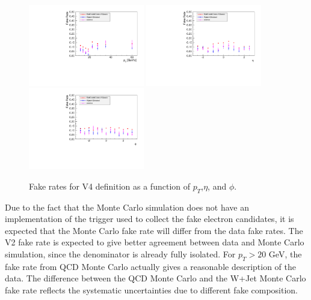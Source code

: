\begin{figure}[!htbp]
\begin{center}
\includegraphics[width=0.45\textwidth]{figures/ElectronFakeRate_DenominatorV4_ptThreshold15_Pt.pdf}
\includegraphics[width=0.45\textwidth]{figures/ElectronFakeRate_DenominatorV4_ptThreshold15_Eta.pdf}
\includegraphics[width=0.45\textwidth]{figures/ElectronFakeRate_DenominatorV4_ptThreshold15_Phi.pdf}
\caption{Fake rates for V4 definition as a function of $p_T$,$\eta$, and $\phi$.}
\label{fig:ele_fr_V4_jet15}
\end{center}
\end{figure}

Due to the fact that the Monte Carlo simulation does not have an implementation of the trigger used
to collect the fake electron candidates, it is expected that the Monte Carlo fake rate will differ
from the data fake rates. The V2 fake rate is expected to give better agreement between data and 
Monte Carlo simulation, since the denominator is already fully isolated. For $p_{T} > 20$ GeV, 
the fake rate from QCD Monte Carlo actually gives a reasonable description of the data. The difference
between the QCD Monte Carlo and the W+Jet Monte Carlo fake rate reflects the systematic uncertainties
due to different fake composition.


